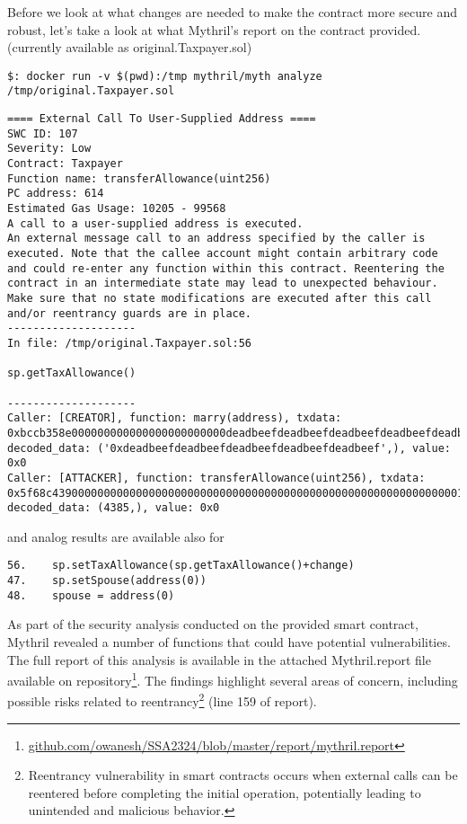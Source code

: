 \documentclass{article}
\begin{document}
Before we look at what changes are needed to make the contract more secure and robust, let's take a look at what Mythril's report on the contract provided. (currently available as original.Taxpayer.sol)
\begin{verbatim}
$: docker run -v $(pwd):/tmp mythril/myth analyze /tmp/original.Taxpayer.sol
\end{verbatim}
\begin{verbatim}
==== External Call To User-Supplied Address ====
SWC ID: 107
Severity: Low
Contract: Taxpayer
Function name: transferAllowance(uint256)
PC address: 614
Estimated Gas Usage: 10205 - 99568
A call to a user-supplied address is executed.
An external message call to an address specified by the caller is executed. Note that the callee account might contain arbitrary code and could re-enter any function within this contract. Reentering the contract in an intermediate state may lead to unexpected behaviour. Make sure that no state modifications are executed after this call and/or reentrancy guards are in place.
--------------------
In file: /tmp/original.Taxpayer.sol:56

sp.getTaxAllowance()

--------------------
Caller: [CREATOR], function: marry(address), txdata: 0xbccb358e000000000000000000000000deadbeefdeadbeefdeadbeefdeadbeefdeadbeef, decoded_data: ('0xdeadbeefdeadbeefdeadbeefdeadbeefdeadbeef',), value: 0x0
Caller: [ATTACKER], function: transferAllowance(uint256), txdata: 0x5f68c4390000000000000000000000000000000000000000000000000000000000001121, decoded_data: (4385,), value: 0x0
\end{verbatim}
and analog results are available also for
\begin{verbatim}
56.    sp.setTaxAllowance(sp.getTaxAllowance()+change)
47.    sp.setSpouse(address(0))
48.    spouse = address(0)
\end{verbatim}
As part of the security analysis conducted on the provided smart contract, Mythril revealed a number of functions that could have potential vulnerabilities. 
The full report of this analysis is available in the attached Mythril.report file available on repository\footnote{\href{https://github.com/Owanesh/SSA2324/blob/main/report/mythril.report}{github.com/owanesh/SSA2324/blob/master/report/mythril.report}}. 
The findings highlight several areas of concern, including possible risks related to 
reentrancy\footnote{Reentrancy vulnerability in smart contracts occurs when external calls can be reentered before completing the initial operation, potentially leading to unintended and malicious behavior.} (line 159 of report). 
\end{document}
